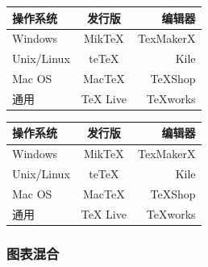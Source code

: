 \begin{table}[htbp]
  \begin{minipage}{0.45\linewidth}
    \centering
    \begin{tabular}{|l|c|r|}
         \hline
        操作系统& 发行版& 编辑器\\
         \hline
        Windows & MikTeX & TexMakerX \\
         \hline
        Unix/Linux & teTeX & Kile \\
         \hline
        Mac OS & MacTeX & TeXShop \\
         \hline
        通用& TeX Live & TeXworks \\
         \hline
    \end{tabular}
    \label{tab:mytab4}
  \end{minipage}
  \quad
  \begin{minipage}{0.45\linewidth}
    \centering
        \begin{tabular}{|l|c|r|}
             \hline
            操作系统& 发行版& 编辑器\\
             \hline
            Windows & MikTeX & TexMakerX \\
             \hline
            Unix/Linux & teTeX & Kile \\
             \hline
            Mac OS & MacTeX & TeXShop \\
             \hline
            通用& TeX Live & TeXworks \\
             \hline
        \end{tabular}
    \label{tab:mytab5}
  \end{minipage}
\end{table}

\subsubsection{图表混合}

